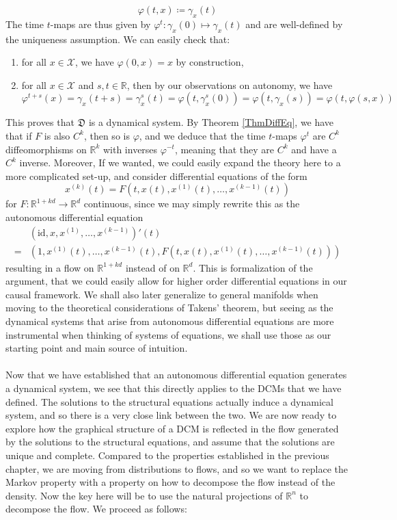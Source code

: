 \documentclass[11pt, a4paper]{memoir}
\theoremstyle{break}
\theoremstyle{break}
\theoremstyle{nonumberplain}
\newcommand{\mR}{\mathbb{R}}
\begin{document}
$$\varphi(t,x)\coloneqq \gamma_x(t)$$
The time $t$-maps are thus given by $\varphi^t:\gamma_x(0)\mapsto \gamma_x(t)$ and are well-defined by the uniqueness assumption. We can easily check that:
\begin{enumerate}[label=(\roman*)]
	\item for all $x\in \mathcal{X}$, we have $\varphi(0,x)=x$ by construction,
	\item for all $x\in \mathcal{X}$ and $s,t\in \mR$, then by our observations on autonomy, we have
	$$\varphi^{t+s}(x)=\gamma_x(t+s)=\gamma_x^s(t)=\varphi(t,\gamma_x^s(0))=\varphi(t,\gamma_x(s))=\varphi(t,\varphi(s,x))$$
\end{enumerate}
This proves that $\mathfrak{D}$ is a dynamical system. By Theorem \ref{ThmDiffEq}, we have that if $F$ is also $C^k$, then so is $\varphi$, and we deduce that the time $t$-maps $\varphi^t$ are $C^k$ diffeomorphisms on $\mR^k$ with inverses $\varphi^{-t}$, meaning that they are $C^k$ and have a $C^k$ inverse. Moreover, If we wanted, we could easily expand the theory here to a more complicated set-up, and consider differential equations of the form
$$x^{(k)}(t)=F\left(t,x(t),x^{(1)}(t),\ldots, x^{(k-1)}(t)\right)$$
for $F:\mR^{1+kd}\to\mR^d$ continuous, since we may simply rewrite this as the autonomous differential equation
\begin{align*}
&\left(\text{id},x,x^{(1)},\ldots,x^{(k-1)}\right)'(t)\\
=&\left(1,x^{(1)}(t),\ldots,x^{(k-1)}(t),F\left(t,x(t),x^{(1)}(t),\ldots, x^{(k-1)}(t)\right)\right)
\end{align*}
resulting in a flow on $\mR^{1+kd}$ instead of on $\mR^d$. This is formalization of the argument, that we could easily allow for higher order differential equations in our causal framework. We shall also later generalize to general manifolds when moving to the theoretical considerations of Takens' theorem, but seeing as the dynamical systems that arise from autonomous differential equations are more instrumental when thinking of systems of equations, we shall use those as our starting point and main source of intuition.\\\\
Now that we have established that an autonomous differential equation generates a dynamical system, we see that this directly applies to the DCMs that we have defined. The solutions to the structural equations actually induce a dynamical system, and so there is a very close link between the two. We are now ready to explore how the graphical structure of a DCM is reflected in the flow generated by the solutions to the structural equations, and assume that the solutions are unique and complete. Compared to the properties established in the previous chapter, we are moving from distributions to flows, and so we want to replace the Markov property with a property on how to decompose the flow instead of the density. Now the key here will be to use the natural projections of $\mR^n$ to decompose the flow. We proceed as follows:\\[5pt]
\end{document}
